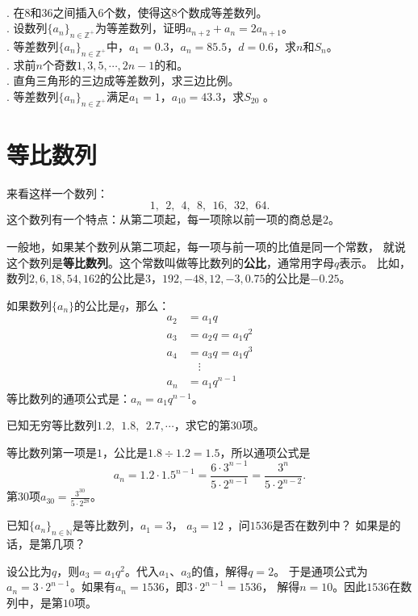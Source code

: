 \documentclass[12pt,UTF8,fontset=none]{ctexbook}
\begin{document}
\begin{xt}
    \mbox{} \\
    . 在$8$和$36$之间插入$6$个数，使得这$8$个数成等差数列。\\
    . 设数列$\{a_n\}_{n\in\mathbb{Z}^+}$为等差数列，证明$a_{n+2} + a_n = 2a_{n+1}$。\\
    . 等差数列$\{a_n\}_{n\in\mathbb{Z}^+}$中，$a_1 = 0.3$，$a_n = 85.5$，$d = 0.6$，求$n$和$S_n$。\\
    . 求前$n$个奇数$1,3,5,\cdots, 2n-1$的和。\\
    . 直角三角形的三边成等差数列，求三边比例。\\
    . 等差数列$\{a_n\}_{n\in\mathbb{Z}^+}$满足$a_1 = 1$，$a_{10}=43.3$，求$S_{20}$ 。    
\end{xt}

\section{等比数列}

来看这样一个数列：
$$ 1,\;\,2,\;\,4,\;\,8,\;\,16,\;\,32,\;\,64. $$
这个数列有一个特点：从第二项起，每一项除以前一项的商总是$2$。

一般地，如果某个数列从第二项起，每一项与前一项的比值是同一个常数，
就说这个数列是\textbf{等比数列}。这个常数叫做等比数列的\textbf{公比}，通常用字母$q$表示。
比如，数列$2,6,18,54,162$的公比是$3$，$192,-48,12,-3,0.75$的公比是$-0.25$。

如果数列$\{a_n\}$的公比是$q$，那么：
\begin{align*}
a_2 &= a_1 q   \\
a_3 &= a_2 q = a_1 q^2  \\
a_4 &= a_3 q = a_1 q^3  \\
&\quad \vdots  \\
a_n &= a_1 q^{n-1}  
\end{align*}
等比数列的通项公式是：$a_n = a_1 q^{n-1}$。
\begin{et}
    已知无穷等比数列$1.2,\;\,1.8,\;\,2.7, \cdots$，求它的第$30$项。    
\end{et}
\begin{so}
等比数列第一项是$1$，公比是$1.8\div1.2=1.5$，所以通项公式是
$$a_n = 1.2 \cdot 1.5^{n-1} = \frac{6\cdot3^{n-1}}{5\cdot2^{n-1}} = \frac{3^n}{5\cdot 2^{n-2}}.$$
第$30$项$a_{30} = \frac{3^{30}}{5\cdot 2^{28}}$。
\end{so}
\begin{et}
    已知$\{a_n\}_{n\in\mathbb{N}}$是等比数列，$a_1 = 3$， $a_3 = 12$ ，问$1536$是否在数列中？
    如果是的话，是第几项？    
\end{et}
\begin{so}
    设公比为$q$，则$a_3 = a_1 q^2$。代入$a_1$、$a_3$的值，解得$q = 2$。
    于是通项公式为$a_n = 3\cdot 2^{n-1}$。如果有$a_n = 1536$，即$3\cdot2^{n-1}=1536$，
    解得$n = 10$。因此$1536$在数列中，是第$10$项。    
\end{so}
\end{document}

